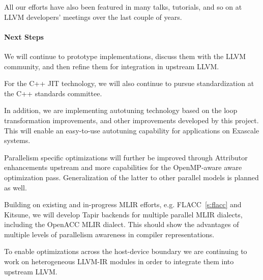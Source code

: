 All our efforts have also been featured in many talks, tutorials, and so on at
LLVM developers' meetings over the last couple of years.

\paragraph{Next Steps}
We will continue to prototype implementations, discuss them with the LLVM
community, and then refine them for integration in upstream LLVM.

For the C++ JIT technology, we will also continue to pursue standardization at
the C++ standards committee.

In addition, we are implementing autotuning technology based on the loop
transformation improvements, and other improvements developed by this project.
This will enable an easy-to-use autotuning capability for applications on
Exascale systems.

Parallelism specific optimizations will further be improved through Attributor
enhancements upstream and more capabilities for the OpenMP-aware aware
optimization pass. Generalization of the latter to other parallel models is
planned as well.

Building on existing and in-progress MLIR efforts, e.g.
FLACC~\ref{s:flacc} and Kitsune, we will develop Tapir backends for
multiple parallel MLIR dialects, including the OpenACC MLIR dialect.
This should show the advantages of multiple levels of parallelism
awareness in compiler representations.

To enable optimizations across the host-device boundary we are continuing to
work on heterogeneous LLVM-IR modules in order to integrate them into upstream
LLVM.




%
